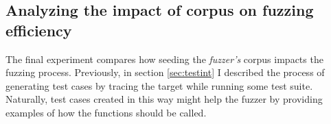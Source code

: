 \subsection{Analyzing the impact of corpus on fuzzing efficiency}
The final experiment compares how seeding the \textit{fuzzer's} corpus impacts the fuzzing process. Previously, in section \ref{sec:testint} I described the process of generating test cases by tracing the target while running some test suite. Naturally, test cases created in this way might help the fuzzer by providing examples of how the functions should be called.
